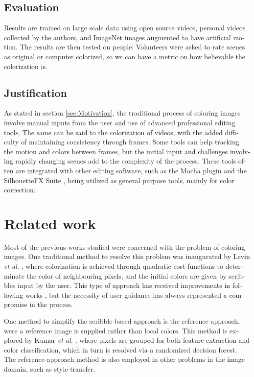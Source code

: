 \documentclass[12pt,openright,twoside,a4paper,english]{abntex2}
\begin{document}
\begin{otherlanguage}{english}
\section{Evaluation}
Results are trained on large scale data using open source videos, personal videos collected by the authors, and ImageNet images augmented to have artificial motion. %
The results are then tested on people: Volunteers were asked to rate scenes as original or computer colorized, so we can have a metric on how believable the colorization is.

\section{Justification}
As stated in section \ref{sec:Motivation}, the traditional process of coloring images involve manual inputs from the user and use of advanced professional editing tools.
The same can be said to the colorization of videos, with the added difficulty of maintaining consistency through frames. Some tools can help tracking the motion and colors between frames, but the initial input and challenges involving rapidly changing scenes add to the complexity of the process. These tools often are integrated with other editing software, such as the Mocha plugin \cite{mocha} and the SilhouetteFX Suite \cite{silhoutte}, being utilized as general purpose tools, mainly for color correction.

\chapter{Related work}
Most of the previous works studied were concerned with the problem of coloring images. One traditional method to resolve this problem was inaugurated by Levin  \textit{et al.} \cite{Levin2004},
where colorization is achieved through quadratic cost-functions to determinate the color of neighbouring pixels, and the initial colors are given by scribbles input by the user. This type of approach has received improvements in following works \cite{Kumar2012},
but the necessity of user-guidance has always represented a compromise in the process.

One method to simplify the scribble-based approach is the reference-approach, were a reference image is supplied rather than local colors. This method is explored by Kumar \textit{et al.} \cite{Kumar2012},
where pixels are grouped for both feature extraction and color classification, which in turn is resolved via a randomized decision forest. The reference-approach method is also employed in other problems in the image domain, such as style-transfer.


\end{otherlanguage}
\end{document}
